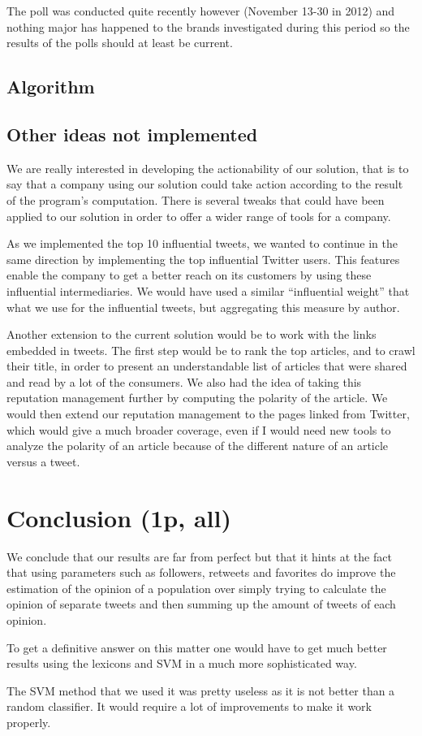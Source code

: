 \documentclass[a4paper,12pt]{report}
\begin{document}
The poll was conducted quite recently however (November 13-30 in 2012) and nothing major has happened to the brands investigated during this period so the results of the polls should at least be current.

\section{Algorithm}

\section{Other ideas not implemented}

We are really interested in developing the actionability of our solution, that is to say that a company using our solution could take action according to the result of the program’s computation. There is several tweaks that could have been applied to our solution in order to offer a wider range of tools for a company.

As we implemented the top 10 influential tweets, we wanted to continue in the same direction by implementing the top influential Twitter users. This features enable the company to get a better reach on its customers by using these influential intermediaries. We would have used a similar “influential weight” that what we use for the influential tweets, but aggregating this measure by author.

Another extension to the current solution would be to work with the links embedded in tweets. The first step would be to rank the top articles, and to crawl their title, in order to present an understandable list of articles that were shared and read by a lot of the consumers. We also had the idea of taking this reputation management further by computing the polarity of the article. We would then extend our reputation management to the pages linked from Twitter, which would give a much broader coverage, even if I would need new tools to analyze the polarity of an article because of the different nature of an article versus a tweet.

\chapter{Conclusion (1p, all)}

We conclude that our results are far from perfect but that it hints at the fact that using parameters such as followers, retweets and favorites do improve the estimation of the opinion of a population over simply trying to calculate the opinion of separate tweets and then summing up the amount of tweets of each opinion.

To get a definitive answer on this matter one would have to get much better results using the lexicons and SVM in a much more sophisticated way.

The SVM method that we used it was pretty useless as it is not better than a random classifier. It would require a lot of improvements to make it work properly.
\end{document}
